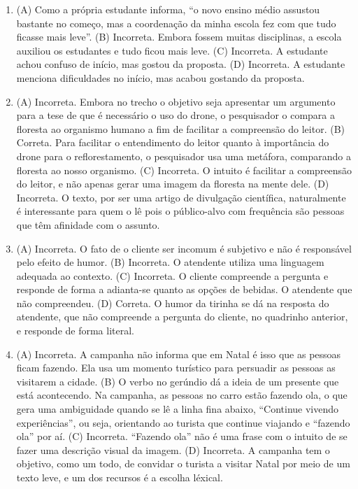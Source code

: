 \begin{enumerate}
\item (A)
  Como a própria estudante informa, ``o novo ensino médio assustou
  bastante no começo, mas a coordenação da minha escola fez com que tudo
  ficasse mais leve''.
(B)
  Incorreta. Embora fossem muitas disciplinas, a escola auxiliou os
  estudantes e tudo ficou mais leve.
(C)
  Incorreta. A estudante achou confuso de início, mas gostou da
  proposta.
(D)
  Incorreta. A estudante menciona dificuldades no início, mas acabou
  gostando da proposta.

\item (A)
  Incorreta. Embora no trecho o objetivo seja apresentar um argumento
  para a tese de que é necessário o uso do drone, o pesquisador o
  compara a floresta ao organismo humano a fim de facilitar a
  compreensão do leitor.
(B)
  Correta. Para facilitar o entendimento do leitor quanto à importância
  do drone para o reflorestamento, o pesquisador usa uma metáfora,
  comparando a floresta ao nosso organismo.
(C)
  Incorreta. O intuito é facilitar a compreensão do leitor, e não apenas
  gerar uma imagem da floresta na mente dele.
(D)
  Incorreta. O texto, por ser uma artigo de divulgação científica,
  naturalmente é interessante para quem o lê pois o público-alvo com
  frequência são pessoas que têm afinidade com o assunto.

\item (A) Incorreta. O fato de o cliente ser incomum é subjetivo e não é
responsável pelo efeito de humor.
(B) Incorreta. O atendente utiliza uma linguagem adequada ao contexto.
(C) Incorreta. O cliente compreende a pergunta e responde de forma a
adianta-se quanto as opções de bebidas. O atendente que não compreendeu.
(D) Correta. O humor da tirinha se dá na resposta do atendente, que não
compreende a pergunta do cliente, no quadrinho anterior, e responde de
forma literal.

\item (A) Incorreta. A campanha não informa que em Natal é isso que as pessoas
ficam fazendo. Ela usa um momento turístico para persuadir as pessoas as
visitarem a cidade.
(B) O verbo no gerúndio dá a ideia de um presente que está acontecendo.
Na campanha, as pessoas no carro estão fazendo ola, o que gera uma
ambiguidade quando se lê a linha fina abaixo, ``Continue vivendo
experiências'', ou seja, orientando ao turista que continue viajando e
``fazendo ola'' por aí.
(C) Incorreta. ``Fazendo ola'' não é uma frase com o intuito de se fazer
uma descrição visual da imagem.
(D) Incorreta. A campanha tem o objetivo, como um todo, de convidar o
turista a visitar Natal por meio de um texto leve, e um dos recursos é a
escolha léxical.


\end{enumerate}
